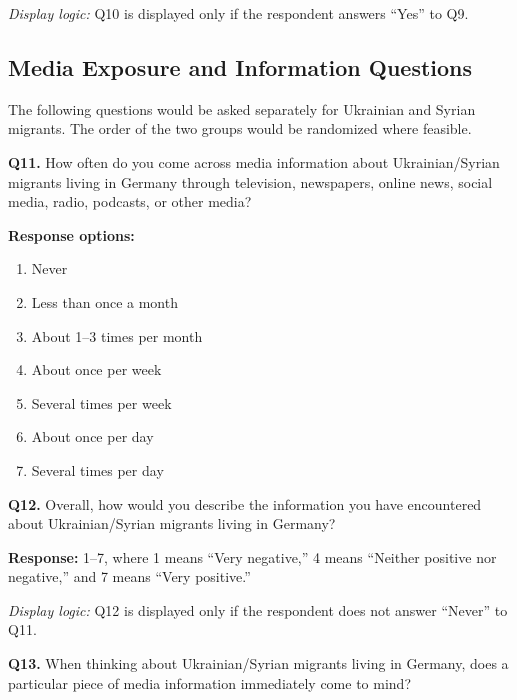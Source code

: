 \smallskip

\noindent
\textit{Display logic:} Q10 is displayed only if the respondent answers
``Yes'' to Q9.

\subsection{Media Exposure and Information Questions}

The following questions would be asked separately for Ukrainian and Syrian
migrants. The order of the two groups would be randomized where feasible.

\medskip

\noindent\textbf{Q11.}
How often do you come across media information about Ukrainian/Syrian migrants
living in Germany through television, newspapers, online news, social media,
radio, podcasts, or other media?

\smallskip

\noindent\textbf{Response options:}

\begin{enumerate}
    \item Never
    \item Less than once a month
    \item About 1--3 times per month
    \item About once per week
    \item Several times per week
    \item About once per day
    \item Several times per day
\end{enumerate}

\medskip

\noindent\textbf{Q12.}
Overall, how would you describe the information you have encountered about
Ukrainian/Syrian migrants living in Germany?

\smallskip

\noindent
\textbf{Response:} 1--7, where 1 means ``Very negative,''
4 means ``Neither positive nor negative,'' and 7 means ``Very positive.''

\smallskip

\noindent
\textit{Display logic:} Q12 is displayed only if the respondent does not
answer ``Never'' to Q11.

\medskip

\noindent\textbf{Q13.}
When thinking about Ukrainian/Syrian migrants living in Germany, does a
particular piece of media information immediately come to mind?

